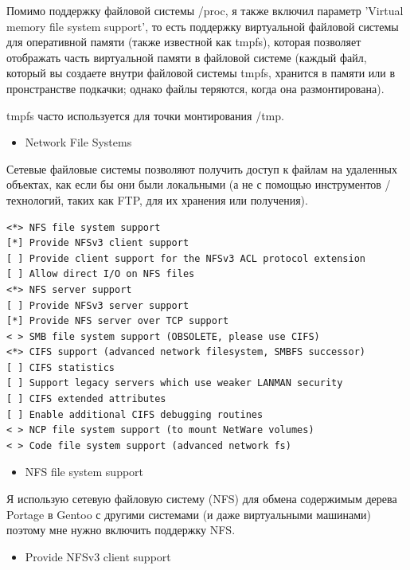 \documentclass[10pt]{book}
\begin{document}
Помимо поддержку файловой системы /proc, я также включил параметр 'Virtual memory file system support', то есть поддержку виртуальной файловой системы для оперативной памяти (также известной как tmpfs), которая позволяет отображать часть виртуальной памяти в файловой системе (каждый файл, который вы создаете внутри файловой системы tmpfs, хранится в памяти или в пронстранстве подкачки; однако файлы теряются, когда она размонтирована).

tmpfs часто используется для точки монтирования /tmp.

\begin{itemize}
\item Network File Systems                      
\end{itemize}

Сетевые файловые системы позволяют получить доступ к файлам на удаленных объектах, как если бы они были локальными (а не с помощью инструментов / технологий, таких как FTP, для их хранения или получения).

\vspace{3mm}
\begin{tcolorbox}[colback=gray!14!white, colframe=blue!75!blue]
\begin{lstlisting}
<*> NFS file system support
[*] Provide NFSv3 client support
[ ] Provide client support for the NFSv3 ACL protocol extension
[ ] Allow direct I/O on NFS files
<*> NFS server support
[ ] Provide NFSv3 server support
[*] Provide NFS server over TCP support
< > SMB file system support (OBSOLETE, please use CIFS)
<*> CIFS support (advanced network filesystem, SMBFS successor)
[ ] CIFS statistics
[ ] Support legacy servers which use weaker LANMAN security
[ ] CIFS extended attributes
[ ] Enable additional CIFS debugging routines
< > NCP file system support (to mount NetWare volumes)
< > Code file system support (advanced network fs)
\end{lstlisting}
\end{tcolorbox}

\begin{itemize}
\item NFS file system support 
\end{itemize}

Я использую сетевую файловую систему (NFS) для обмена содержимым дерева Portage в Gentoo с другими системами (и даже виртуальными машинами) поэтому мне нужно включить поддержку NFS.

\begin{itemize}
\item Provide NFSv3 client support
\end{itemize}
\end{document}
